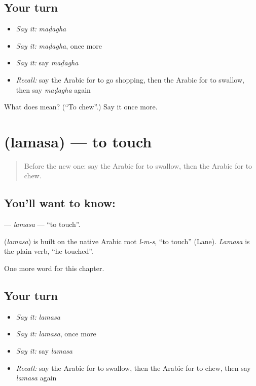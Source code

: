 \subsection*{Your turn}
\begin{itemize}
\raggedright
  \item \emph{Say it:} \emph{maḍagha}
  \item \emph{Say it:} \emph{maḍagha}, once more
  \item \emph{Say it:} say \emph{maḍagha}
  \item \emph{Recall:} say the Arabic for to go shopping, then the Arabic for to swallow, then say \emph{maḍagha} again
\end{itemize}

\begin{tcolorbox}[breakable,colback=teal!4,colframe=teal!35!black,title={Before you move on}]
What does  mean? (\textquotedblleft{}To chew\textquotedblright{}.) Say it once more.
\end{tcolorbox}
\section[\texorpdfstring{\ar{لمس} (lamasa)}{لمس (lamasa)}]{ (lamasa) — to touch}

\label{lesson:AR-C194-lamasa}



\begin{quote}
Before the new one: say the Arabic for to swallow, then the Arabic for to chew.
\end{quote}

\subsection*{You'll want to know: }
\textbf{} — \emph{lamasa} — \textquotedblleft{}to touch\textquotedblright{}.

\begin{cousinweb}
\textbf{} (\emph{lamasa}) is built on the native Arabic root \emph{l-m-s}, \textquotedblleft{}to touch\textquotedblright{} (Lane). \emph{Lamasa} is the plain verb, \textquotedblleft{}he touched\textquotedblright{}.
\end{cousinweb}

\begin{grammarlens}[title={What you've built}]
One more word for this chapter.
\end{grammarlens}

\subsection*{Your turn}
\begin{itemize}
\raggedright
  \item \emph{Say it:} \emph{lamasa}
  \item \emph{Say it:} \emph{lamasa}, once more
  \item \emph{Say it:} say \emph{lamasa}
  \item \emph{Recall:} say the Arabic for to swallow, then the Arabic for to chew, then say \emph{lamasa} again
\end{itemize}

